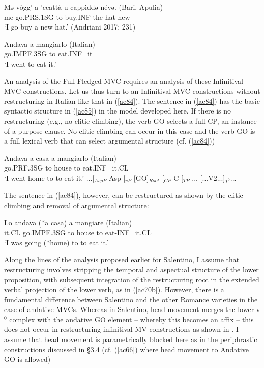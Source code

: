 \documentclass[output=paper]{langscibook}
\begin{document}
\ea \label{ac82}\gll Mə  vògg’    a  ’ccattà  u  cappìddə  névə.   \hfill (Bari, Apulia)\\
   me  go.PRS.1SG to  buy.INF  the  hat    new {}\\
   \glt ‘I go buy a new hat.’ \hfill (Andriani 2017: 231)
\z

\ea \label{ac83}\gll Andava      a     mangiarlo      \hfill (Italian)\\
     go.IMPF.3SG   to    eat.INF=it {}\\
    \glt ‘I went to eat it.’ 
\z

An analysis of the Full-Fledged MVC requires an analysis of these Infinitival MVC constructions. Let us thus turn to an Infinitival MVC constructions without restructuring in Italian like that in (\ref{ac84}).  The sentence in (\ref{ac84}) has the basic syntactic structure in (\ref{ac85}) in the model developed here.  If there is no restructuring (e.g., no clitic climbing), the verb GO selects a full CP, an instance of a purpose clause. No clitic climbing can occur in this case and the verb GO is a full lexical verb that can select argumental structure (cf. (\ref{ac84}))

\ea \label{ac84}\gll Andava   a casa   a    mangiarlo       \hfill (Italian)\\
    go.PRF.3SG to house  to   eat.INF=it.CL\\
    \glt ‘I went home to to eat it.’
\ex \label{ac85}...[$_{AspP}$ Asp [$_{vP}$ [GO]$_{Root}$ [$_{CP}$ C [$_{TP}$ ... [...V2...]$_{T^0}$...
\z

The sentence in (\ref{ac84}), however, can be restructured as shown by the clitic climbing and removal of argumental structure:

\ea \label{ac86}\gll Lo   andava    (*a casa) a mangiare  \hfill    (Italian)\\
    it.CL go.IMPF.3SG  to house to  eat-INF=it.CL\\
    \glt ‘I was going  (*home) to to eat it.’
\z

Along the lines of the analysis proposed earlier for Salentino, I assume that restructuring involves stripping the temporal and aspectual structure of the lower proposition, with subsequent integration of the restructuring root in the extended verbal projection of the lower verb, as in (\ref{ac70b}).  However, there is a fundamental difference between Salentino and the other Romance varieties in the case of andative MVCs. Whereas in Salentino, head movement merges the lower v$^0$ complex with the andative GO element -- whereby this becomes an affix -- this does not occur in restructuring infinitival MV constructions as shown in .  I assume that head movement is parametrically blocked here as in the periphrastic constructions discussed in §3.4 (cf. (\ref{ac66}) where head movement to Andative GO is allowed)
\end{document}
